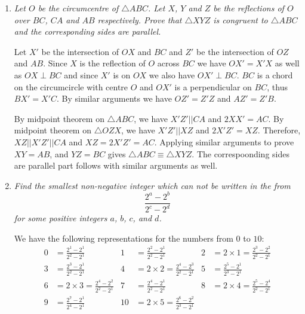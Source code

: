 \documentclass{article}
\begin{document}
\begin{enumerate}[1.]
\item %
{\itshape Let $O$ be the circumcentre of $\triangle ABC$. Let $X$, $Y$ and $Z$ be the reflections of $O$ over $BC$, $CA$ and $AB$ respectively. Prove that $\triangle XYZ$ is congruent to $\triangle ABC$ and the corresponding sides are parallel.}

Let $X'$ be the intersection of $OX$ and $BC$ and $Z'$ be the intersection of $OZ$ and $AB$. Since $X$ is the reflection of $O$ across $BC$ we have $OX' = X'X$ as well as $OX \perp BC$ and since $X'$ is on $OX$ we also have $OX' \perp BC$. $BC$ is a chord on the circumcircle with centre $O$ and $OX'$ is a perpendicular on $BC$, thus $BX' = X'C$. By similar arguments we have $OZ' = Z'Z$ and $AZ' = Z'B$. 

By midpoint theorem on $\triangle ABC$, we have $X'Z'||CA$ and $2XX' = AC$. By midpoint theorem on $\triangle OZX$, we have $X'Z'||XZ$ and $2X'Z' = XZ$. Therefore, $XZ||X'Z'||CA$ and $XZ = 2X'Z' = AC$. Applying similar arguments to prove $XY = AB$, and $YZ = BC$ gives $\triangle ABC \equiv \triangle XYZ$. The correspoonding sides are parallel part follows with similar arguments as well. 


\item %
{\itshape Find the smallest non-negative integer which can not be written in the from
\[
  \frac{2^a - 2^b}{2^c - 2^d}
\]
for some positive integers $a$, $b$, $c$, and $d$.}

We have the following representations for the numbers from $0$ to $10$:
\begin{align*}
  0 & = \frac{2^1 - 2^1}{2^2 - 2^1} & 1 & = \frac{2^2 - 2^1}{2^2 - 2^1} & 2 & = 2 \times 1 = \frac{2^3 - 2^2}{2^2 - 2^1} \\
  3 & = \frac{2^3 - 2^1}{2^2 - 2^1} & 4 & = 2 \times 2 = \frac{2^4 - 2^3}{2^2 - 2^1} & 5 & = \frac{2^5 - 2^1}{2^3 - 2^1} \\
  6 & = 2 \times 3 = \frac{2^4 - 2^2}{2^2 - 2^1} & 7 & = \frac{2^4 - 2^1}{2^2 - 2^1} & 8 & = 2 \times 4 = \frac{2^5 - 2^4}{2^2 - 2^1} \\
  9 & = \frac{2^7 - 2^1}{2^4 - 2^1} & 10 & = 2 \times 5 = \frac{2^6 - 2^2}{2^3 - 2^1} & &
\end{align*}


\end{enumerate}
\end{document}

